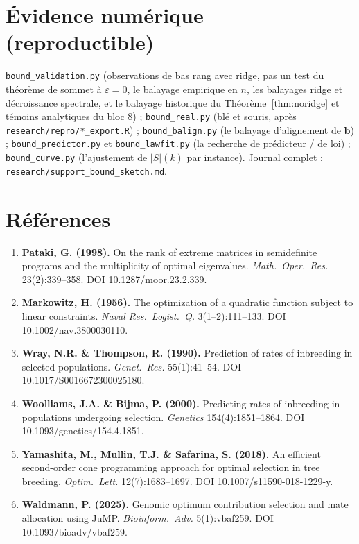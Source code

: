\documentclass[11pt]{article}
\theoremstyle{plain}
\newcommand{\bb}{\mathbf{b}}
\begin{document}
\section*{Évidence numérique (reproductible)}

\texttt{bound\_validation.py} (observations de bas rang avec ridge, pas un test du théorème de sommet à $\varepsilon=0$, le balayage empirique en $n$, les balayages ridge et
décroissance spectrale, et le balayage historique du Théorème~\ref{thm:noridge} et témoins analytiques du bloc 8) ;
\texttt{bound\_real.py} (blé et souris, après \texttt{research/repro/*\_export.R}) ;
\texttt{bound\_balign.py} (le balayage d'alignement de $\bb$) ; \texttt{bound\_predictor.py} et
\texttt{bound\_lawfit.py} (la recherche de prédicteur / de loi) ; \texttt{bound\_curve.py} (l'ajustement
de $|S|(k)$ par instance). Journal complet : \texttt{research/support\_bound\_sketch.md}.

\section*{Références}
\sloppy
\begin{enumerate}[leftmargin=2em]
\item \textbf{Pataki, G. (1998).} On the rank of extreme matrices in semidefinite programs and the multiplicity of optimal eigenvalues. \emph{Math.\ Oper.\ Res.} 23(2):339--358. DOI 10.1287/moor.23.2.339.
\item \textbf{Markowitz, H. (1956).} The optimization of a quadratic function subject to linear constraints. \emph{Naval Res.\ Logist.\ Q.} 3(1--2):111--133. DOI 10.1002/nav.3800030110.
\item \textbf{Wray, N.R. \& Thompson, R. (1990).} Prediction of rates of inbreeding in selected populations. \emph{Genet.\ Res.} 55(1):41--54. DOI 10.1017/S0016672300025180.
\item \textbf{Woolliams, J.A. \& Bijma, P. (2000).} Predicting rates of inbreeding in populations undergoing selection. \emph{Genetics} 154(4):1851--1864. DOI 10.1093/genetics/154.4.1851.
\item \textbf{Yamashita, M., Mullin, T.J. \& Safarina, S. (2018).} An efficient second-order cone programming approach for optimal selection in tree breeding. \emph{Optim.\ Lett.} 12(7):1683--1697. DOI 10.1007/s11590-018-1229-y.
\item \textbf{Waldmann, P. (2025).} Genomic optimum contribution selection and mate allocation using JuMP. \emph{Bioinform.\ Adv.} 5(1):vbaf259. DOI 10.1093/bioadv/vbaf259.
\end{enumerate}
\end{document}
